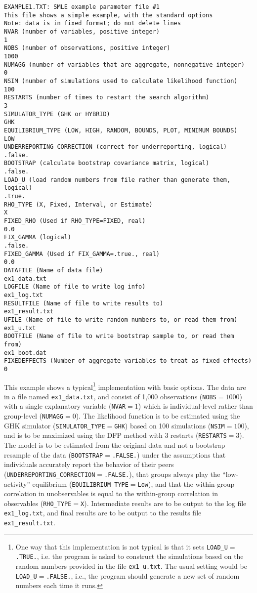 \documentclass{article}
\begin{document}
\hspace{1in}\begin{minipage}[c]{5in}
{\scriptsize
\begin{verbatim}
EXAMPLE1.TXT: SMLE example parameter file #1
This file shows a simple example, with the standard options
Note: data is in fixed format; do not delete lines
NVAR (number of variables, positive integer)
1
NOBS (number of observations, positive integer)
1000
NUMAGG (number of variables that are aggregate, nonnegative integer)
0
NSIM (number of simulations used to calculate likelihood function)
100
RESTARTS (number of times to restart the search algorithm)
3
SIMULATOR_TYPE (GHK or HYBRID)
GHK
EQUILIBRIUM_TYPE (LOW, HIGH, RANDOM, BOUNDS, PLOT, MINIMUM BOUNDS)
LOW
UNDERREPORTING_CORRECTION (correct for underreporting, logical)
.false.
BOOTSTRAP (calculate bootstrap covariance matrix, logical)
.false.
LOAD_U (load random numbers from file rather than generate them, logical)
.true.
RHO_TYPE (X, Fixed, Interval, or Estimate)
X
FIXED_RHO (Used if RHO_TYPE=FIXED, real)
0.0
FIX_GAMMA (logical)
.false.
FIXED_GAMMA (Used if FIX_GAMMA=.true., real)
0.0
DATAFILE (Name of data file)
ex1_data.txt
LOGFILE (Name of file to write log info)
ex1_log.txt
RESULTFILE (Name of file to write results to)
ex1_result.txt
UFILE (Name of file to write random numbers to, or read them from)
ex1_u.txt
BOOTFILE (Name of file to write bootstrap sample to, or read them from)
ex1_boot.dat
FIXEDEFFECTS (Number of aggregate variables to treat as fixed effects)
0

\end{verbatim}
}
\end{minipage}
 
This example shows a typical\footnote{One way that this implementation is not typical
is that it sets {\tt LOAD\_U}$=${\tt .TRUE.}, i.e. the program is asked to
construct the simulations based on the random numbers provided in the 
file {\tt ex1\_u.txt}. The usual setting would be {\tt LOAD\_U}$=${\tt .FALSE.}, 
i.e., the program should generate a new set of random numbers each time it runs.}
implementation with basic options.
The data are in a file named {\tt ex1\_data.txt}, and consist
of 1,000 observations ({\tt NOBS}$=1000$) with a single explanatory 
variable ({\tt NVAR}$= 1$) which is individual-level rather than group-level
({\tt NUMAGG}$=0$).  The likelihood function is to be estimated using 
the GHK simulator ({\tt SIMULATOR\_TYPE}$=${\tt GHK}) based on 100
simulations ({\tt NSIM}$=100$), and is to be maximized using the
DFP method with 3 restarts ({\tt RESTARTS}$=3$).  The model is to be estimated
from the original data and not a bootstrap resample of the data 
({\tt BOOTSTRAP}$=${\tt .FALSE.}) under the assumptions that 
individuals accurately report the behavior of their peers
({\tt UNDERREPORTING\_CORRECTION}$=${\tt .FALSE.}), that 
groups always play the ``low-activity'' equilibrium 
({\tt EQUILIBRIUM\_TYPE}$=${\tt Low}), and that the within-group
correlation in unobservables is equal to the within-group correlation 
in observables ({\tt RHO\_TYPE}$=${\tt X}).  Intermediate results 
are to be output to the log file {\tt ex1\_log.txt}, and 
final results are to be output to the results file
{\tt ex1\_result.txt}.
\end{document}
